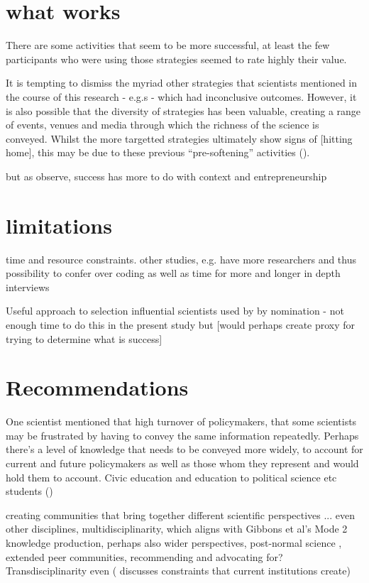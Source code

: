 {\section{what works}
There are some activities that seem to be more successful, at least the few participants who were using those strategies seemed to rate highly their value. 

It is tempting to dismiss the myriad other strategies that scientists mentioned in the course of this research - e.g.s - which had inconclusive outcomes. However, it is also possible that the diversity of strategies has been valuable, creating a range of events, venues and media through which the richness of the science is conveyed. Whilst the more targetted strategies ultimately show signs of [hitting home], this may be due to these previous ``pre-softening'' activities (\cite{Cairney2018}).

but as \textcite{CairneyO2020} observe, success has more to do with context and entrepreneurship

\section{limitations}
time and resource constraints. other studies, e.g. \cite{HaynesDCRHGS2011,OjanenBKP2021} have more researchers and thus possibility to confer over coding as well as time for more and longer in depth interviews

Useful approach to selection influential scientists used by \textcite{HaynesDCRHGS2011} by nomination - not enough time to do this in the present study but [would perhaps create proxy for trying to determine what is success]

\section{Recommendations}
One scientist mentioned that high turnover of policymakers, that some scientists may be frustrated by having to convey the same information repeatedly. Perhaps there's a level of knowledge that needs to be conveyed more widely, to account for current and future policymakers as well as those whom they represent and would hold them to account. Civic education and education to political science etc students (\cite{DykeM2024}) 

creating communities that bring together different scientific perspectives ... even other disciplines, multidisciplinarity, which aligns with Gibbons et al's Mode 2 knowledge production, perhaps also wider perspectives, post-normal science \cite{FuntowiczR1993}, extended peer communities, \cite{Jasanoff2003} recommending and advocating for? Transdisciplinarity even (\textcite{RussellWC2008} discusses constraints that current institutions create)

}
